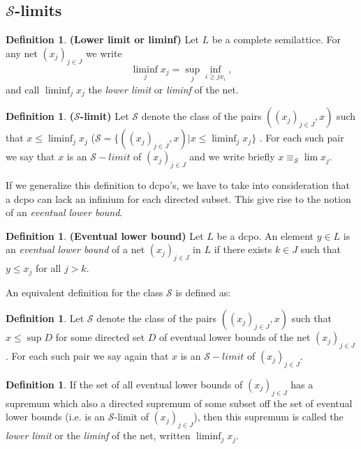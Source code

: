 \documentclass[a4paper,12pt]{article}
\theoremstyle{definition}
\newtheorem{definition}[theorem]{Definition}
\begin{document}
\subsection{$\mathcal{S}$-limits}
\begin{definition} \textbf{(Lower limit or liminf)} Let $L$ be a complete semilattice. For any net $(x_j)_{j\in J}$ we write
$$\liminf_j x_j = \sup_j \inf_{i \geq j x_i},$$
and call $\liminf_j x_j$ the \emph{lower limit} or \emph{liminf} of the net.
\end{definition}

\begin{definition} \textbf{($\mathcal{S}$-limit)} Let $\mathcal{S}$ denote the class of the pairs $((x_j)_{j\in J}, x)$ such that $x \leq \liminf_j x_j$ ($\mathcal{S} = \{((x_j)_{j\in J}, x) | x \leq \liminf_j x_j \}$ . For each such pair we say that $x$ is an $\mathcal{S}-limit$ of $(x_j)_{j \in J}$ and we write briefly $x \equiv_{\mathcal{S}} \lim x_j$.
\end{definition}
If we generalize this definition to dcpo's, we have to take into consideration that a dcpo can lack an infinium for each directed subset. This give rise to the notion of an \emph{eventual lower bound}.

\begin{definition}\textbf{(Eventual lower bound)} Let $L$ be a dcpo. An element $y \in L$ is an \emph{eventual lower bound} of a net $(x_j)_{j\in J}$ in $L$ if there exists $k \in J$ such that $y \leq x_j$ for all $j > k$.
\end{definition}

An equivalent definition for the class $\mathcal{S}$ is defined as:

\begin{definition}
 Let $\mathcal{S}$ denote the class of the pairs $((x_j)_{j\in J}, x)$ such that $x \leq \sup D$ for some directed set $D$ of eventual lower bounds of the net $(x_j)_{j\in J}$. For each such pair we say again that $x$ is an $\mathcal{S}-limit$ of $(x_j)_{j \in J}$.
\end{definition}

\begin{definition}If the set of all eventual lower bounds of $(x_j)_{j\in J}$ has a supremum which also a directed supremum of some subset off the set of eventual lower bounds (i.e. is an $\mathcal{S}$-limit of $(x_j)_{j\in J}$), then this supremum is called the \emph{lower limit} or the \emph{liminf} of the net, written $\liminf_j x_j$.
\end{definition}
\end{document}
